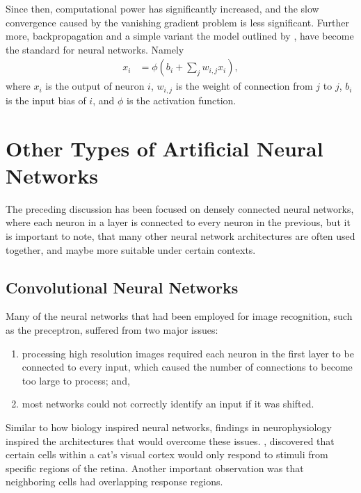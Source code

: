 Since then, computational power has significantly increased, and the slow
convergence caused by the vanishing gradient problem is less significant.
Further more, backpropagation and a simple variant the model outlined by
\cite{McClelland:1986:Parallel}, have become the standard for neural networks.
Namely
\begin{align*}
    x_i &= \phi\left(b_i + \sum_j w_{i,j} x_i\right),
\end{align*}
where $x_i$ is the output of neuron $i$, $w_{i,j}$ is the weight of connection
from $j$ to $j$, $b_i$ is the input bias of $i$, and $\phi$ is the activation
function.




\section{Other Types of Artificial Neural Networks}

The preceding discussion has been focused on densely connected neural
networks, where each neuron in a layer is connected to every neuron in the
previous, but it is important to note, that many other neural network
architectures are often used together, and maybe more suitable under certain
contexts.




\subsection{Convolutional Neural Networks}
\label{subsec:history:conv}

Many of the neural networks that had been employed for image recognition, such
as the preceptron, suffered from two major issues:
\begin{enumerate}
    \item processing high resolution images required each neuron in the first
        layer to be connected to every input, which caused the number of
        connections to become too large to process; and,
    \item most networks could not correctly identify an input if it was shifted.
\end{enumerate}
Similar to how biology inspired neural networks, findings in neurophysiology
inspired the architectures that would overcome these issues.
\cite{Hubel:1959:Receptive}, discovered that certain cells within a cat's
visual cortex would only respond to stimuli from specific regions of the retina.
Another important observation was that neighboring cells had overlapping
response regions.

